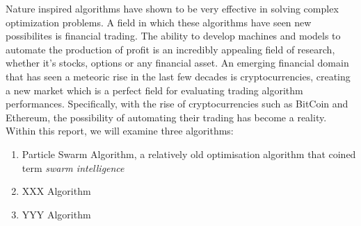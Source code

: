 Nature inspired algorithms have shown to be very effective in solving complex optimization problems. A field in which these algorithms have seen new possibilites
is financial trading. The ability to develop machines and models to automate the production of profit is an incredibly appealing field of research, whether it's 
stocks, options or any financial asset. An emerging financial domain that has seen a meteoric rise in the last few decades is cryptocurrencies, creating a new market 
which is a perfect field for evaluating trading algorithm performances. Specifically, with the rise of cryptocurrencies such as BitCoin and Ethereum, 
the possibility of automating their trading has become a reality. Within this report, we will examine three algorithms:

\begin{enumerate}
    \item Particle Swarm Algorithm, a relatively old optimisation algorithm that coined term \textit{swarm intelligence}
    \item XXX Algorithm
    \item YYY Algorithm
\end{enumerate}


